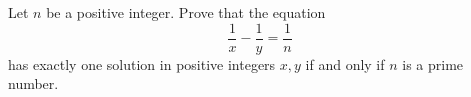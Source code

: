Let $n$ be a positive integer. Prove that the equation
\[
\dfrac{1}{x}-\dfrac{1}{y}=\dfrac{1}{n}
\]
has exactly one solution in positive integers $x,y$ if and only if $n$ is a prime number.
